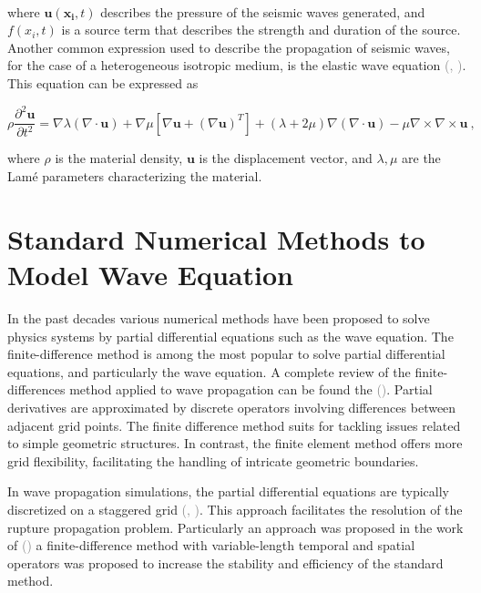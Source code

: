 \documentclass[11pt,twoside]{article}
\renewcommand{\citep}[2][]{\textcolor{gray}{(\citeauthor{#2}, \citeyear[#1]{#2})}}
\renewcommand{\citeauthoryear}[2][]{\textcolor{gray}{\citeauthor{#2} (\textcolor{gray}{\citeyear[#1]{#2}})}}
\begin{document}
\

where \( \boldsymbol{u}(\boldsymbol{x_i}, t) \) describes the pressure of the seismic waves generated, and \( f(x_i, t) \) is a source term that describes the strength and duration of the source. Another common expression used to describe the propagation of seismic waves, for the case of a heterogeneous isotropic medium, is the elastic wave equation \citep{moseley_fast_2018,lehmann_fourier_2023}. This equation can be expressed as 

\begin{equation}
\rho \frac{\partial^2 \boldsymbol{u}}{\partial t^2} = \nabla \lambda (\nabla \cdot \boldsymbol{u}) + \nabla \mu \left[\nabla \boldsymbol{u} + (\nabla \boldsymbol{u})^T\right] + (\lambda + 2\mu) \nabla (\nabla \cdot \boldsymbol{u}) - \mu \nabla \times \nabla \times \boldsymbol{u} \ ,
\label{elastic}
\end{equation}

where $\rho$ is the material density, $\boldsymbol{u}$ is the displacement vector, and $\lambda, \mu$ are the Lamé parameters characterizing the material.

\section{Standard Numerical Methods to Model Wave Equation}\label{sec:tnm}



In the past decades various numerical methods have been proposed to solve physics systems by partial differential equations such as the wave equation. The finite-difference method is among the most popular to solve partial differential equations, and particularly the wave equation. A complete review of the finite-differences method applied to wave propagation can be found the \citeauthoryear{Moczo2014}. Partial derivatives are approximated by discrete operators involving differences between adjacent grid points. The finite difference method suits for tackling issues related to simple geometric structures. In contrast, the finite element method offers more grid flexibility, facilitating the handling of intricate geometric boundaries.

In wave propagation simulations, the partial differential equations are typically discretized on a staggered grid \citep{madariaga_dynamics_1976,Virieux1986}. This approach facilitates the resolution of the rupture propagation problem. Particularly an approach was proposed in the work of \citeauthoryear{Zhou2021} a finite-difference method with variable-length temporal and spatial operators was proposed to increase the stability and efficiency of the standard method.
\end{document}
